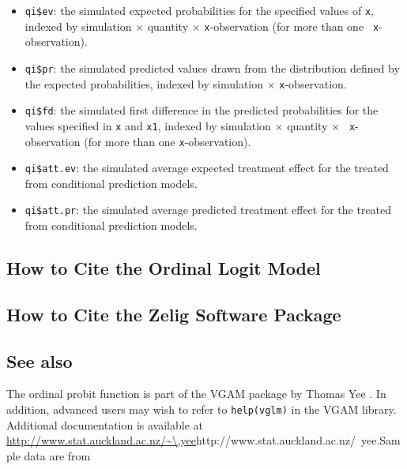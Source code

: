 \documentclass{article}
\begin{document}
\begin{itemize}
   \begin{itemize}
   \item {\tt qi\$ev}: the simulated expected probabilities for the
     specified values of {\tt x}, indexed by simulation $\times$
     quantity $\times$ {\tt x}-observation (for more than one {\tt
       x}-observation).
   \item {\tt qi\$pr}: the simulated predicted values drawn from the
     distribution defined by the expected probabilities, indexed by
     simulation $\times$ {\tt x}-observation.
   \item {\tt qi\$fd}: the simulated first difference in the predicted
     probabilities for the values specified in {\tt x} and {\tt x1},
     indexed by simulation $\times$ quantity $\times$ {\tt
       x}-observation (for more than one {\tt x}-observation).
   \item {\tt qi\$att.ev}: the simulated average expected treatment
     effect for the treated from conditional prediction models.  
   \item {\tt qi\$att.pr}: the simulated average predicted treatment
     effect for the treated from conditional prediction models.  
   \end{itemize}
\end{itemize}


\subsection*{How to Cite the Ordinal Logit Model}

\subsection*{How to Cite the Zelig Software Package}
\CiteZelig

\subsection*{See also}
The ordinal probit function is part of the VGAM package by Thomas Yee \citep{YeeHas03}. In addition, advanced users may wish to refer to \texttt{help(vglm)} 
in the VGAM library.  Additional documentation is available at
\url{http://www.stat.auckland.ac.nz/\~\,yee}{http://www.stat.auckland.ac.nz/~yee}.Sample data are from \cite{Martin92}




\end{document}
